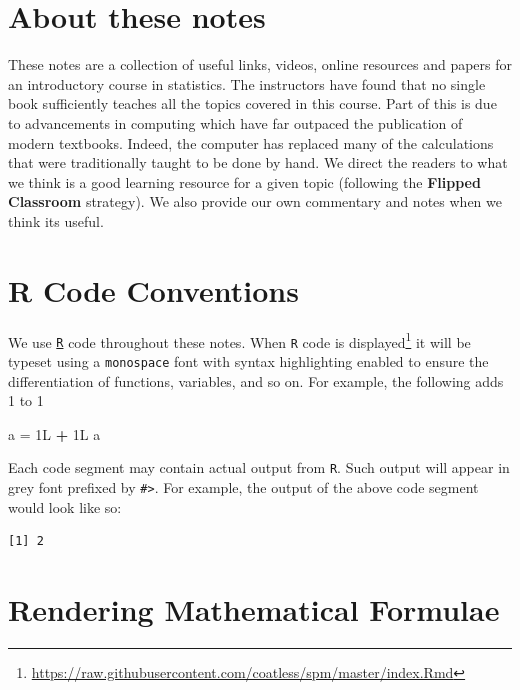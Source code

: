 \documentclass[]{book}
\makeatletter
\newenvironment{Shaded}{\begin{snugshade}}{\end{snugshade}}
\newcommand{\StringTok}[1]{\textcolor[rgb]{0.31,0.60,0.02}{#1}}
\newcommand{\OperatorTok}[1]{\textcolor[rgb]{0.81,0.36,0.00}{\textbf{#1}}}
\newcommand{\NormalTok}[1]{#1}
\let\rmarkdownfootnote\footnote%
\def\footnote{\protect\rmarkdownfootnote}
\newenvironment{kframe}{%
\medskip{}
\setlength{\fboxsep}{.8em}
 \def\at@end@of@kframe{}%
 \ifinner\ifhmode%
  \def\at@end@of@kframe{\end{minipage}}%
  \begin{minipage}{\columnwidth}%
 \fi\fi%
 \def\FrameCommand##1{\hskip\@totalleftmargin \hskip-\fboxsep
 \colorbox{shadecolor}{##1}\hskip-\fboxsep
     \hskip-\linewidth \hskip-\@totalleftmargin \hskip\columnwidth}%
 \MakeFramed {\advance\hsize-\width
   \@totalleftmargin\z@ \linewidth\hsize
   \@setminipage}}%
 {\par\unskip\endMakeFramed%
 \at@end@of@kframe}
\renewenvironment{Shaded}{\begin{kframe}}{\end{kframe}}
\makeatother
\begin{document}
\section*{About these notes}\label{about-these-notes}

These notes are a collection of useful links, videos, online resources
and papers for an introductory course in statistics. The instructors
have found that no single book sufficiently teaches all the topics
covered in this course. Part of this is due to advancements in computing
which have far outpaced the publication of modern textbooks. Indeed, the
computer has replaced many of the calculations that were traditionally
taught to be done by hand. We direct the readers to what we think is a
good learning resource for a given topic (following the \textbf{Flipped
Classroom} strategy). We also provide our own commentary and notes when
we think its useful.

\section*{R Code Conventions}\label{r-code-conventions}

We use \href{https://cran.r-project.org/}{\texttt{R}} code throughout
these notes. When \texttt{R} code is displayed\footnote{\url{https://raw.githubusercontent.com/coatless/spm/master/index.Rmd}}
it will be typeset using a \texttt{monospace} font with syntax
highlighting enabled to ensure the differentiation of functions,
variables, and so on. For example, the following adds 1 to 1

\begin{Shaded}
\begin{Highlighting}[]
\NormalTok{a =}\StringTok{ }\NormalTok{1L }\OperatorTok{+}\StringTok{ }\NormalTok{1L}
\NormalTok{a}
\end{Highlighting}
\end{Shaded}

Each code segment may contain actual output from \texttt{R}. Such output
will appear in grey font prefixed by \texttt{\#\textgreater{}}. For
example, the output of the above code segment would look like so:

\begin{verbatim}
[1] 2
\end{verbatim}

\section*{Rendering Mathematical
Formulae}\label{rendering-mathematical-formulae}
\end{document}
